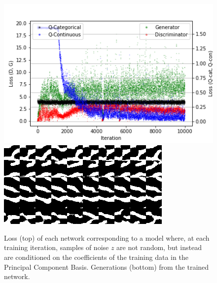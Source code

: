 \documentclass{article}
\begin{document}
\begin{figure}[h]
\centering
  \includegraphics[]{figures/Sampling_PCA.png}
  \includegraphics[]{figures/PCAsample_fig_test.png}
  \caption{Loss (top) of each network corresponding to a model where, at each training iteration, samples of noise $z$ are not random, but instead are conditioned on the coefficients of the training data in the Principal Component Basis.  Generations (bottom) from the trained network.}
\end{figure}\label{zPCA}
\end{document}
